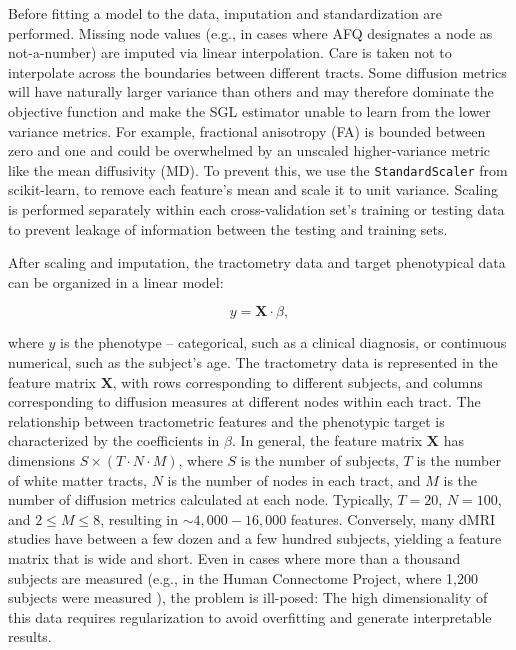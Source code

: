 Before fitting a model to the data, imputation and standardization are
performed. Missing node values (e.g., in cases where AFQ designates a node as
not-a-number) are imputed via linear interpolation. Care is taken not to
interpolate across the boundaries between different tracts. Some diffusion
metrics will have naturally larger variance than others and may therefore
dominate the objective function and make the SGL estimator unable to learn from
the lower variance metrics. For example, fractional anisotropy (FA) is bounded
between zero and one and could be overwhelmed by an unscaled higher-variance
metric like the mean diffusivity (MD). To prevent this, we use the
\lstinline{StandardScaler} from scikit-learn\cite{scikit-learn}, to remove each
feature's mean and scale it to unit variance. Scaling is performed separately
within each cross-validation set's training or testing data to prevent leakage
of information between the testing and training sets\cite{kaufman2012leakage}.

After scaling and imputation, the tractometry data and target phenotypical data
can be organized in a linear model:

\begin{equation}
y = \mathbf{X} \cdot \beta,
\label{eq:lm}
\end{equation}

where $y$ is the phenotype -- categorical, such as a clinical diagnosis, or
continuous numerical, such as the subject's age. The tractometry data is
represented in the feature matrix $\mathbf{X}$, with rows corresponding to
different subjects, and columns corresponding to diffusion measures at different
nodes within each tract. The relationship between tractometric features and the
phenotypic target is characterized by the coefficients in $\beta$. In general,
the feature matrix $\mathbf{X}$ has dimensions $S \times (T \cdot N \cdot M)$,
where $S$ is the number of subjects, $T$ is the number of white matter tracts,
$N$ is the number of nodes in each tract, and $M$ is the number of diffusion
metrics calculated at each node. Typically, $T = 20$, $N = 100$, and $2 \le M
\le 8$, resulting in $\sim 4,000 - 16,000$  features. Conversely, many dMRI
studies have between a few dozen and a few hundred subjects, yielding a feature
matrix that is wide and short. Even in cases where more than a thousand subjects
are measured (e.g., in the Human Connectome Project, where 1,200 subjects were
measured \cite{VanEssen2012}), the problem is ill-posed: The high dimensionality
of this data requires regularization to avoid overfitting and generate
interpretable results.


